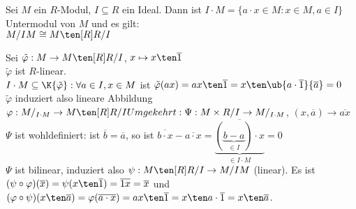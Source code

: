 \begin{Prop}
  Sei $M$ ein $R$-Modul, $I \subseteq R$ ein Ideal. Dann ist $I \cdot M = 
  \{ a \cdot x \in M: x \in M, a \in I \}$ Untermodul von $M$ und es gilt: \\
  $M/IM \cong M \ten[R] R/I$
\end{Prop}

\begin{Bew}
  Sei $\tilde{\varphi}: M \rightarrow M \ten[R] R/I$, 
  $ x \mapsto x \ten \overline 1$\\
  $\tilde{\varphi}$  ist $R$-linear.\\
  $I \cdot M \subseteq \K{\tilde{\varphi}}: \forall a \in I, x \in M$ ist
  $\tilde{\varphi}(ax) = ax \ten \overline 1 = x \ten \ub{ a \cdot \overline 1
  }{\overline a} = 0$\\
  $\tilde{\varphi}$ induziert also lineare Abbildung\\
  $\varphi: M/_{I \cdot M} \rightarrow M \ten[R] R/I\\
  Umgekehrt: \Psi: M \times R/I \rightarrow M /_{I \cdot M}$, $(x, \overline a) \rightarrow \overline{ax}$ \\
  $\Psi$ ist wohldefiniert: ist $\overline b = \overline a$, so ist $\overline{b \cdot x} - \overline{a \cdot x} =
  \overline{ \underbrace {( \underbrace{b-a}_{\in I}) \cdot x}_{ \in I \cdot M}} =0$\\
  $\Psi$ ist bilinear, induziert also $\psi: M \ten[R] R/I \to M/IM$ (linear). Es ist 
  $(\psi \circ \varphi)(\overline x )= \psi(x \ten \overline 1 ) =
  \overline{1x} = \overline x$ und
  $(\varphi \circ \psi)(x \ten \overline a ) = \varphi(\overline{a \cdot x }) =
  ax \ten \overline 1 = x \ten a\cdot \overline 1 = x \ten \overline a$.
\end{Bew}
